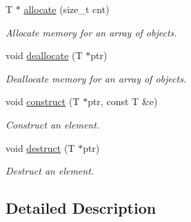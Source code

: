 \begin{DoxyCompactItemize}
\item 
T $\ast$ \hyperlink{classirr_1_1core_1_1irrAllocatorFast_a952d1328adf6f9fd558a1571c39bd724}{allocate} (size\+\_\+t cnt)\hypertarget{classirr_1_1core_1_1irrAllocatorFast_a952d1328adf6f9fd558a1571c39bd724}{}\label{classirr_1_1core_1_1irrAllocatorFast_a952d1328adf6f9fd558a1571c39bd724}

\begin{DoxyCompactList}\small\item\em Allocate memory for an array of objects. \end{DoxyCompactList}\item 
void \hyperlink{classirr_1_1core_1_1irrAllocatorFast_a5ad4218c20277e81515570e9356684d3}{deallocate} (T $\ast$ptr)\hypertarget{classirr_1_1core_1_1irrAllocatorFast_a5ad4218c20277e81515570e9356684d3}{}\label{classirr_1_1core_1_1irrAllocatorFast_a5ad4218c20277e81515570e9356684d3}

\begin{DoxyCompactList}\small\item\em Deallocate memory for an array of objects. \end{DoxyCompactList}\item 
void \hyperlink{classirr_1_1core_1_1irrAllocatorFast_a70ced0e984c516b5cd959aa7c17c602b}{construct} (T $\ast$ptr, const T \&e)\hypertarget{classirr_1_1core_1_1irrAllocatorFast_a70ced0e984c516b5cd959aa7c17c602b}{}\label{classirr_1_1core_1_1irrAllocatorFast_a70ced0e984c516b5cd959aa7c17c602b}

\begin{DoxyCompactList}\small\item\em Construct an element. \end{DoxyCompactList}\item 
void \hyperlink{classirr_1_1core_1_1irrAllocatorFast_a2ae7c1784480a6405e40c62101d08642}{destruct} (T $\ast$ptr)\hypertarget{classirr_1_1core_1_1irrAllocatorFast_a2ae7c1784480a6405e40c62101d08642}{}\label{classirr_1_1core_1_1irrAllocatorFast_a2ae7c1784480a6405e40c62101d08642}

\begin{DoxyCompactList}\small\item\em Destruct an element. \end{DoxyCompactList}\end{DoxyCompactItemize}


\subsection{Detailed Description}
